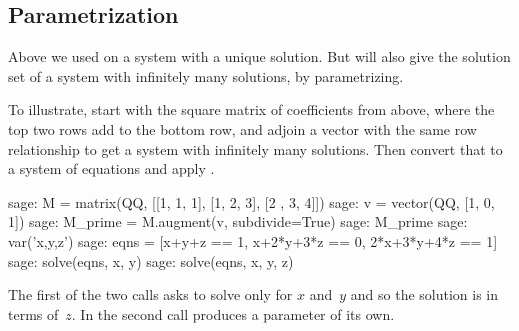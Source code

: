 





\subsection{Parametrization}
Above we used  on a system with a unique solution.
But  will also give the solution set of a system
with infinitely many solutions, by parametrizing.

To illustrate, start with the square matrix of coefficients from above,
where the top two rows add to the bottom row,
and adjoin a vector with the same row relationship to get
a system with infinitely many solutions.
Then convert that to a system of equations and apply .
\begin{sagecommandline}
sage: M = matrix(QQ, [[1, 1, 1], [1, 2, 3], [2 , 3, 4]])    
sage: v = vector(QQ, [1, 0, 1])                            
sage: M_prime = M.augment(v, subdivide=True)               
sage: M_prime
sage: var('x,y,z')          
sage: eqns = [x+y+z == 1, x+2*y+3*z == 0, 2*x+3*y+4*z == 1]
sage: solve(eqns, x, y)   
sage: solve(eqns, x, y, z)                                 
\end{sagecommandline}
The first of the two  calls asks \Sage{} 
to solve only for $x$ and~$y$ and so the solution is in terms of~$z$.
In the second call \Sage{} produces a parameter of its own.   




